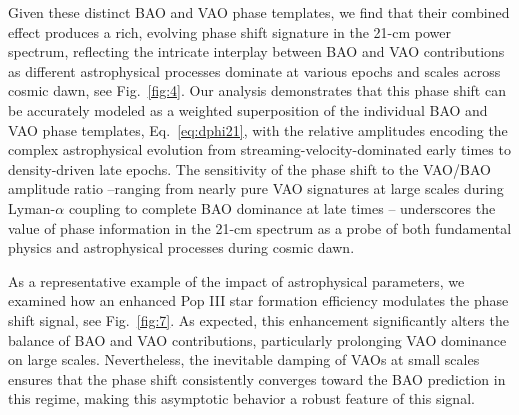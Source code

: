 \documentclass[floats,floatfix,showpacs,amssymb,prd,twocolumn,superscriptaddress,nofootinbib,reprint,preprintnumbers]{revtex4-2}
\begin{document}
Given these distinct BAO and VAO phase templates, we find that their combined effect produces a rich, evolving phase shift signature in the 21-cm power spectrum, reflecting the intricate interplay between BAO and VAO contributions as different astrophysical processes dominate at various epochs and scales across cosmic dawn, see Fig.~\ref{fig:4}. Our analysis demonstrates that this phase shift can be accurately modeled as a weighted superposition of the individual BAO and VAO phase templates, Eq.~\eqref{eq:dphi21}, with the relative amplitudes encoding the complex astrophysical evolution from streaming-velocity-dominated early times to density-driven late epochs. The sensitivity of the phase shift to the VAO/BAO amplitude ratio --ranging from nearly pure VAO signatures at large scales during Lyman-$\alpha$ coupling to complete BAO dominance at late times -- underscores the value of phase information in the 21-cm spectrum as a probe of both fundamental physics and astrophysical processes during cosmic dawn.

As a representative example of the impact of astrophysical parameters, we examined how an enhanced Pop III star formation efficiency modulates the phase shift signal, see Fig.~\ref{fig:7}. As expected, this enhancement significantly alters the balance of BAO and VAO contributions, particularly prolonging VAO dominance on large scales. Nevertheless, the inevitable damping of VAOs at small scales ensures that the phase shift consistently converges toward the BAO prediction in this regime, making this asymptotic behavior a robust feature of this signal.
\end{document}
